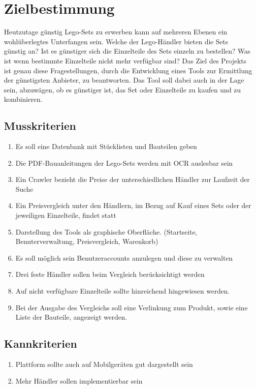 \tableofcontents

\newpage

\section{Zielbestimmung}

Heutzutage günstig Lego-Sets zu erwerben kann auf mehreren Ebenen ein wohlüberlegtes Unterfangen sein. Welche der Lego-Händler bieten die Sets günstig an? Ist es günstiger sich die Einzelteile des Sets einzeln zu bestellen? Was ist wenn bestimmte Einzelteile nicht mehr verfügbar sind? \newline
Das Ziel des Projekts ist genau diese Fragestellungen, durch die Entwicklung eines Tools zur Ermittlung der günstigsten Anbieter, zu beantworten. Das Tool soll dabei auch in der Lage sein, abzuwägen, ob es günstiger ist, das Set oder Einzelteile zu kaufen und zu kombinieren.

\subsection{Musskriterien}
\begin{enumerate}
\item Es soll eine Datenbank mit Stücklisten und Bauteilen geben
\item Die PDF-Bauanleitungen der Lego-Sets werden mit OCR auslesbar sein
\item Ein Crawler bezieht die Preise der unterschiedlichen Händler zur Laufzeit der Suche
\item  Ein Preisvergleich unter den Händlern, im Bezug auf Kauf eines Sets oder der jeweiligen Einzelteile, findet statt
\item Darstellung des Tools als graphische Oberfläche. (Startseite, Benuterverwaltung, Preisvergleich, Warenkorb)
\item Es soll möglich sein Benutzeraccounts anzulegen und diese zu verwalten
\item Drei feste Händler sollen beim Vergleich berücksichtigt werden
\item Auf nicht verfügbare Einzelteile sollte hinreichend hingewiesen werden.
\item Bei der Ausgabe des Vergleichs soll eine Verlinkung zum Produkt, sowie eine Liste der Bauteile, angezeigt werden.
\end{enumerate}

\subsection{Kannkriterien}
\begin{enumerate}
\item Plattform sollte auch auf Mobilgeräten gut dargestellt sein
\item Mehr Händler sollen implementierbar sein
\end{enumerate}


